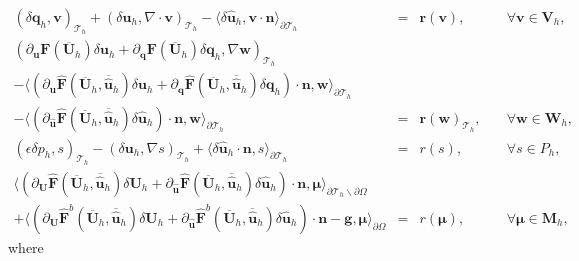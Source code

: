 \documentclass[11pt]{article}
\begin{document}
\begin{equation}
\begin{array}{rcll}
(\delta \bm{q}_h, \bm{v})_{\mathcal{T}_h} + (\delta \bm{u}_h, \nabla \cdot \bm{v})_{\mathcal{T}_h} - \langle \delta \widehat{\bm{u}}_h, \bm{v} \cdot \bm{n} \rangle_{\partial \mathcal{T}_h}  & = & \bm{r}(\bm{v}), & \quad \forall \bm{v} \in \bm{V}_h, \\[2ex] 
(\partial_{\bm{u}} \bm{F} (\overline{\bm{U}}_h) \delta \bm{u}_h + \partial_{\bm{q}} \bm{F} (\overline{\bm{U}}_h) \delta \bm{q}_h, \nabla \bm{w})_{\mathcal{T}_h} & & \\[2ex]
- \langle (\partial_{\bm{u}} \widehat{\bm{F}} (\overline{\bm{U}}_h,\overline{\widehat{\bm{u}}}_h) \delta \bm{u}_h + \partial_{{\bm{q}}} \widehat{\bm{F}} (\overline{\bm{U}}_h,\overline{\widehat{\bm{u}}}_h) \delta {\bm{q}}_h) \cdot \bm{n}, \bm{w} \rangle_{\partial \mathcal{T}_h} & & \\[2ex]
 - \langle (\partial_{\widehat{\bm{u}}} \widehat{\bm{F}} (\overline{\bm{U}}_h,  \overline{\widehat{\bm{u}}}_h) \delta \widehat{\bm{u}}_h) \cdot \bm{n}, \bm{w} \rangle_{\partial \mathcal{T}_h}   & = &  \bm{r}(\bm{w})_{\mathcal{T}_h},  & \quad \forall \bm{w} \in \bm{W}_h, \\[2ex]
 (\epsilon \delta p_h, s)_{\mathcal{T}_h} - (\delta \bm{u}_h, \nabla s)_{\mathcal{T}_h} + \langle \delta \widehat{\bm{u}}_h \cdot \bm{n},s \rangle_{\partial \mathcal{T}_h}  & = & r(s), & \quad \forall s \in P_h, \\[2ex]
 \langle (\partial_{\bm{U}} \widehat{\bm{F}} (\overline{\bm{U}}_h, \overline{\widehat{\bm{u}}}_h) \delta\bm{U}_h + \partial_{\widehat{\bm{u}}} \widehat{\bm{F}} (\overline{\bm{U}}_h, \overline{\widehat{\bm{u}}}_h) \delta \widehat{\bm{u}}_h ) \cdot \bm{n}, \bm{\mu} \rangle_{\partial \mathcal{T}_h \backslash \partial \Omega} & & \\[2ex]
  + \langle (\partial_{\bm{U}} \widehat{\bm{F}}^b (\overline{\bm{U}}_h, \overline{\widehat{\bm{u}}}_h) \delta\bm{U}_h + \partial_{\widehat{\bm{u}}} \widehat{\bm{F}}^b (\overline{\bm{U}}_h, \overline{\widehat{\bm{u}}}_h) \delta \widehat{\bm{u}}_h ) \cdot \bm{n}  - \bm{g}, \bm{\mu} \rangle_{\partial \Omega}  & = & r(\bm{\mu}), & \quad \forall \bm{\mu} \in \bm{M}_h ,
\end{array}
\end{equation}
where
\end{document}
